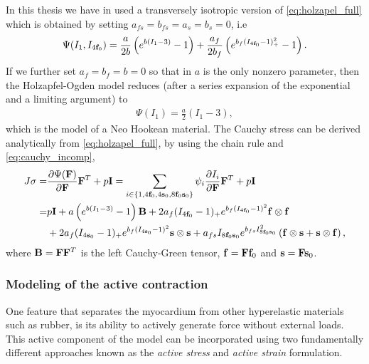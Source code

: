 In this thesis we have in used a transversely isotropic version of
\eqref{eq:holzapel_full} which is obtained by setting $a_{fs} =
b_{fs}= a_s = b_s = 0$, i.e 
\begin{align}
  \label{eq:holzapel_trans}
  \begin{split}
  \Psi(I_1, I_{4\mathbf{f}_0}) = \frac{a}{2 b} \left( e^{ b (I_1 - 3)}  -1 \right)
  + \frac{a_f}{2 b_f} \left( e^{ b_f (I_{4\mathbf{f}_0} - 1)_+^2} -1 \right).
  \end{split}
\end{align}
If we further set $a_f = b_f = b = 0$ so that in $a$ is the
only nonzero parameter, then the Holzapfel-Ogden model reduces (after a
series expansion of the exponential and a limiting argument) to
\begin{align}
  \Psi(I_1)  = \frac{a}{2} \left( I_1 - 3 \right), 
\end{align}
which is the model of a Neo Hookean material. The Cauchy stress can be derived
analytically from \eqref{eq:holzapel_full}, by using the chain rule and
\eqref{eq:cauchy_incomp}, 
\begin{align}
  \begin{split}
    J\mathbf{\sigma}
    =& \frac{\partial \Psi(\mathbf{F})}{\partial \mathbf{F}}\mathbf{F}^{T} + p \mathbf{I}
    = \sum_{i \in \left\{ 1, 4\mathbf{f}_0,  4\mathbf{s}_0,  8\mathbf{f}_0\mathbf{s}_0 \right\} }
    \psi_i \frac{\partial I_i}{\partial \mathbf{F}}\mathbf{F}^{T} + p \mathbf{I} \\
    =& p \mathbf{I} + a \left( e^{ b (I_1 - 3)}  -1 \right) \mathbf{B} 
    + 2 a_f (I_{4\mathbf{f}_0} - 1)_+  e^{ b_f (I_{4\mathbf{f}_0} - 1)^2} \mathbf{f} \otimes \mathbf{f} \\
    &+ 2 a_f (I_{4\mathbf{s}_0} - 1)_+  e^{ b_f (I_{4\mathbf{s}_0} - 1)^2} \mathbf{s} \otimes \mathbf{s} 
    + a_{fs} I_{8\mathbf{f}_0\mathbf{s}_0}  e^{ b_{fs} I_{8\mathbf{f}_0\mathbf{s}_0}^2} \left( \mathbf{f} \otimes \mathbf{s}  +  \mathbf{s} \otimes \mathbf{f} \right),
  \end{split}
\end{align}
where $\mathbf{B} = \mathbf{F} \mathbf{F}^{T}$ is the left Cauchy-Green tensor,
$\mathbf{f} = \mathbf{F} \mathbf{f}_0$ and $\mathbf{s} = \mathbf{F} \mathbf{s}_0$.

\subsubsection{Modeling of the active contraction}
  

One feature that separates the myocardium from other hyperelastic
materials such as rubber, is its ability to actively generate force
without external loads. This active component of the model can be
incorporated using two fundamentally different approaches known as the
\emph{active stress} and \emph{active strain} formulation.


